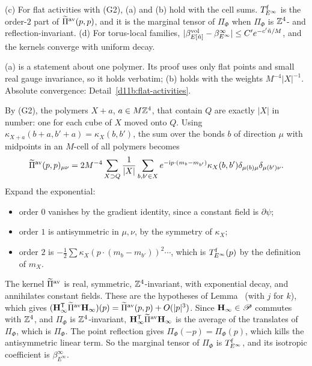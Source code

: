 \begin{detail}\label{d11b:pv-cd}
(c) For flat activities with (G2), (a) and (b) hold with the cell sums. $T^{\rm f}_{E^\infty}$ is the order-$2$ part of $\widetilde\Pi^{\rm av}(p,p)$, and it is the marginal tensor of $\Pi_\Phi$ when $\Pi_\Phi$ is $\mathbb Z^4$- and reflection-invariant. (d) For torus-local families, $|\beta^{\rm vol}_{E[\tilde n]}-\beta^\infty_{E^\infty}|\le C'e^{-c'\tilde n/M}$, and the kernels converge with uniform decay.
\end{detail}

\begin{step}
(a) is a statement about one polymer. Its proof uses only flat points and small real gauge invariance, so it holds verbatim; (b) holds with the weights $M^{-4}|X|^{-1}$. Absolute convergence: Detail~\ref{d11b:flat-activities}.

By (G2), the polymers $X+a$, $a\in M\mathbb Z^4$, that contain $Q$ are exactly $|X|$ in number: one for each cube of $X$ moved onto $Q$. Using $\kappa_{X+a}(b+a,b'+a)=\kappa_X(b,b')$, the sum over the bonds $b$ of direction $\mu$ with midpoints in an $M$-cell of all polymers becomes
\[
\widetilde\Pi^{\rm av}(p,p)_{\mu\nu}=2M^{-4}\sum_{X\supset Q}\frac1{|X|}\sum_{b,b'\in X}e^{-\mathrm i p\cdot(m_b-m_{b'})}\kappa_X(b,b')\delta_{\mu(b)\mu}\delta_{\mu(b')\nu}.
\]
Expand the exponential:
\begin{itemize}
\item order $0$ vanishes by the gradient identity, since a constant field is $\partial\psi$;
\item order $1$ is antisymmetric in $\mu,\nu$, by the symmetry of $\kappa_X$;
\item order $2$ is $-\frac12\sum\kappa_X(p\cdot(m_b-m_{b'}))^2\cdots$, which is $T^{\rm f}_{E^\infty}(p)$ by the definition of $m_X$.
\end{itemize}
The kernel $\widetilde\Pi^{\rm av}$ is real, symmetric, $\mathbb Z^4$-invariant, with exponential decay, and annihilates constant fields. These are the hypotheses of Lemma~ (with $j$ for $k$), which gives $(\mathbf H_\infty^{\sf T}\widetilde\Pi^{\rm av}\mathbf H_\infty)(p)=\widetilde\Pi^{\rm av}(p,p)+O(|p|^3)$. Since $\mathbf H_\infty\in\mathscr P$ commutes with $\mathbb Z^4$, and $\Pi_\Phi$ is $\mathbb Z^4$-invariant, $\mathbf H_\infty^{\sf T}\widetilde\Pi^{\rm av}\mathbf H_\infty$ is the average of the translates of $\Pi_\Phi$, which is $\Pi_\Phi$. The point reflection gives $\Pi_\Phi(-p)=\Pi_\Phi(p)$, which kills the antisymmetric linear term. So the marginal tensor of $\Pi_\Phi$ is $T^{\rm f}_{E^\infty}$, and its isotropic coefficient is $\beta^\infty_{E^\infty}$.
\end{step}

